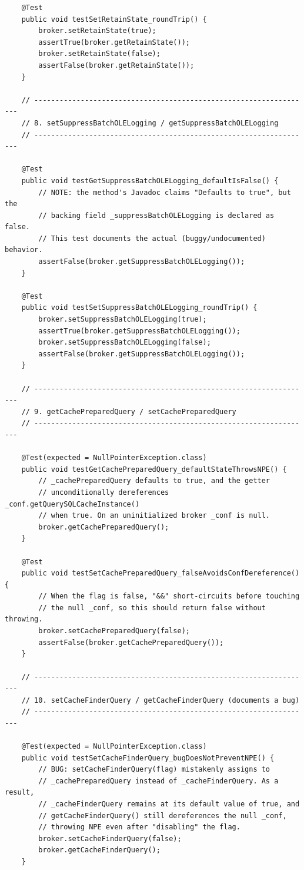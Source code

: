 \begin{lstlisting}
    @Test
    public void testSetRetainState_roundTrip() {
        broker.setRetainState(true);
        assertTrue(broker.getRetainState());
        broker.setRetainState(false);
        assertFalse(broker.getRetainState());
    }

    // ------------------------------------------------------------------
    // 8. setSuppressBatchOLELogging / getSuppressBatchOLELogging
    // ------------------------------------------------------------------

    @Test
    public void testGetSuppressBatchOLELogging_defaultIsFalse() {
        // NOTE: the method's Javadoc claims "Defaults to true", but the
        // backing field _suppressBatchOLELogging is declared as false.
        // This test documents the actual (buggy/undocumented) behavior.
        assertFalse(broker.getSuppressBatchOLELogging());
    }

    @Test
    public void testSetSuppressBatchOLELogging_roundTrip() {
        broker.setSuppressBatchOLELogging(true);
        assertTrue(broker.getSuppressBatchOLELogging());
        broker.setSuppressBatchOLELogging(false);
        assertFalse(broker.getSuppressBatchOLELogging());
    }

    // ------------------------------------------------------------------
    // 9. getCachePreparedQuery / setCachePreparedQuery
    // ------------------------------------------------------------------

    @Test(expected = NullPointerException.class)
    public void testGetCachePreparedQuery_defaultStateThrowsNPE() {
        // _cachePreparedQuery defaults to true, and the getter
        // unconditionally dereferences _conf.getQuerySQLCacheInstance()
        // when true. On an uninitialized broker _conf is null.
        broker.getCachePreparedQuery();
    }

    @Test
    public void testSetCachePreparedQuery_falseAvoidsConfDereference() {
        // When the flag is false, "&&" short-circuits before touching
        // the null _conf, so this should return false without throwing.
        broker.setCachePreparedQuery(false);
        assertFalse(broker.getCachePreparedQuery());
    }

    // ------------------------------------------------------------------
    // 10. setCacheFinderQuery / getCacheFinderQuery (documents a bug)
    // ------------------------------------------------------------------

    @Test(expected = NullPointerException.class)
    public void testSetCacheFinderQuery_bugDoesNotPreventNPE() {
        // BUG: setCacheFinderQuery(flag) mistakenly assigns to
        // _cachePreparedQuery instead of _cacheFinderQuery. As a result,
        // _cacheFinderQuery remains at its default value of true, and
        // getCacheFinderQuery() still dereferences the null _conf,
        // throwing NPE even after "disabling" the flag.
        broker.setCacheFinderQuery(false);
        broker.getCacheFinderQuery();
    }


\end{lstlisting}
